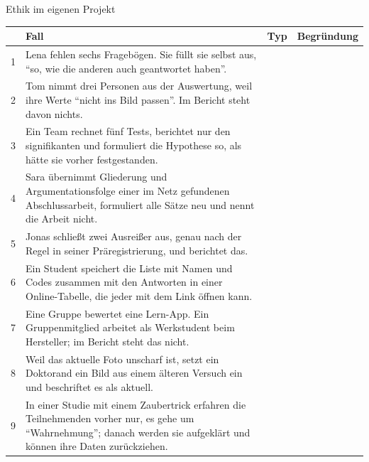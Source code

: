 \begin{uebungsblatt}{Ethik im eigenen Projekt}
\begin{center}\small
\renewcommand{\arraystretch}{1.5}
\begin{tabular}{|c|p{}|p{}|p{}|}
\hline
 & \textbf{Fall} & \textbf{Typ} & \textbf{Begründung} \\
\hline
1 & Lena fehlen sechs Fragebögen. Sie füllt sie selbst aus, \enquote{so, wie die anderen auch geantwortet haben}. & & \\ \hline
2 & Tom nimmt drei Personen aus der Auswertung, weil ihre Werte \enquote{nicht ins Bild passen}. Im Bericht steht davon nichts. & & \\ \hline
3 & Ein Team rechnet fünf Tests, berichtet nur den signifikanten und formuliert die Hypothese so, als hätte sie vorher festgestanden. & & \\ \hline
4 & Sara übernimmt Gliederung und Argumentationsfolge einer im Netz gefundenen Abschlussarbeit, formuliert alle Sätze neu und nennt die Arbeit nicht. & & \\ \hline
5 & Jonas schließt zwei Ausreißer aus, genau nach der Regel in seiner Präregistrierung, und berichtet das. & & \\ \hline
6 & Ein Student speichert die Liste mit Namen und Codes zusammen mit den Antworten in einer Online-Tabelle, die jeder mit dem Link öffnen kann. & & \\ \hline
7 & Eine Gruppe bewertet eine Lern-App. Ein Gruppenmitglied arbeitet als Werkstudent beim Hersteller; im Bericht steht das nicht. & & \\ \hline
8 & Weil das aktuelle Foto unscharf ist, setzt ein Doktorand ein Bild aus einem älteren Versuch ein und beschriftet es als aktuell. & & \\ \hline
9 & In einer Studie mit einem Zaubertrick erfahren die Teilnehmenden vorher nur, es gehe um \enquote{Wahrnehmung}; danach werden sie aufgeklärt und können ihre Daten zurückziehen. & & \\ \hline
\end{tabular}
\end{center}

\end{uebungsblatt}

